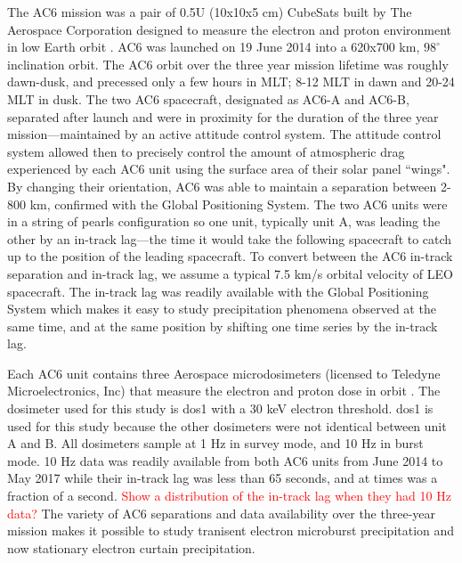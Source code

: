 \documentclass[draft]{agujournal2019}
\begin{document}
The AC6 mission was a pair of 0.5U (10x10x5 cm) CubeSats built by The Aerospace Corporation designed to measure the electron and proton environment in low Earth orbit \cite{O'brien2016}. AC6 was launched on 19 June 2014 into a 620x700 km, $98^\circ$ inclination orbit. The AC6 orbit over the three year mission lifetime was roughly dawn-dusk, and precessed only a few hours in MLT; 8-12 MLT in dawn and 20-24 MLT in dusk. The two AC6 spacecraft, designated as AC6-A and AC6-B, separated after launch and were in proximity for the duration of the three year mission---maintained by an active attitude control system. The attitude control system allowed then to precisely control the amount of atmospheric drag experienced by each AC6 unit using the surface area of their solar panel ``wings". By changing their orientation, AC6 was able to maintain a separation between 2-800 km, confirmed with the Global Positioning System. The two AC6 units were in a string of pearls configuration so one unit, typically unit A, was leading the other by an in-track lag---the time it would take the following spacecraft to catch up to the position of the leading spacecraft. To convert between the AC6 in-track separation and in-track lag, we assume a typical 7.5 km/s orbital velocity of LEO spacecraft. The in-track lag was readily available with the Global Positioning System which makes it easy to study precipitation phenomena observed at the same time, and at the same position by shifting one time series by the in-track lag.

Each AC6 unit contains three Aerospace microdosimeters (licensed to Teledyne Microelectronics, Inc) that measure the electron and proton dose in orbit \cite{O'brien2016}. The dosimeter used for this study is dos1 with a $30$ keV electron threshold. dos1 is used for this study because the other dosimeters were not identical between unit A and B. All dosimeters sample at 1 Hz in survey mode, and 10 Hz in burst mode. 10 Hz data was readily available from both AC6 units from June 2014 to May 2017 while their in-track lag was less than 65 seconds, and at times was a fraction of a second. \textcolor{red}{Show a distribution of the in-track lag when they had 10 Hz data?} The variety of AC6 separations and data availability over the three-year mission makes it possible to study tranisent electron microburst precipitation \cite{Shumko2019} and now stationary electron curtain precipitation.
\end{document}
